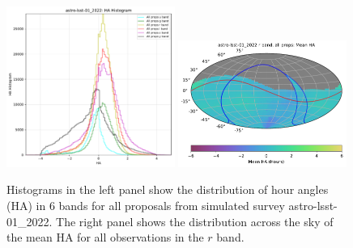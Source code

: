 \documentclass[DM,lsstdraft,authoryear,toc]{lsstdoc}
\begin{document}
\begin{figure}[t!]
\includegraphics[width=0.49\textwidth]{figures/astro-lsst-01_2022-ha_hist_per_filter.pdf}
\includegraphics[width=0.49\textwidth]{figures/astro-lsst-01_2022_Mean_HA_r_band_all_props_OPSI_SkyMap.pdf}
\caption{Histograms in the left panel show the distribution of hour angles (HA) in
6 bands for all proposals from simulated survey astro-lsst-01\_2022.
The right panel shows the distribution across the sky of the mean HA for
all observations in the $r$ band. 
\label{fig:baseline_ha}}
\end{figure}
\end{document}
